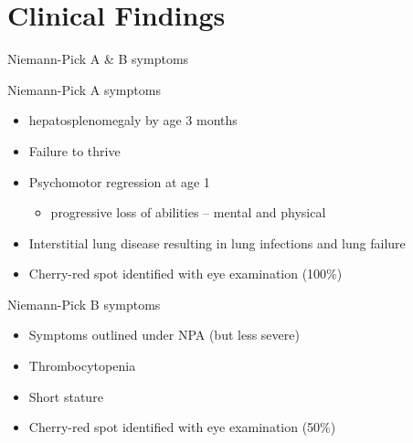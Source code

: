 \documentclass[presentation, smaller]{beamer}
\begin{document}
\section{Clinical Findings}
\label{sec:orgheadline14}

\begin{frame}[label={sec:orgheadline11}]{Niemann-Pick A \& B symptoms}
\begin{block}{Niemann-Pick A symptoms}
\begin{itemize}
\item hepatosplenomegaly by age 3 months
\item Failure to thrive
\item Psychomotor regression at age 1
\begin{itemize}
\item progressive loss of abilities – mental and physical
\end{itemize}
\item Interstitial lung disease resulting in lung infections and lung failure
\item Cherry-red spot identified with eye examination (100\%)
\end{itemize}
\end{block}

\begin{block}{Niemann-Pick B symptoms}
\begin{itemize}
\item Symptoms outlined under NPA (but less severe)
\item Thrombocytopenia
\item Short stature
\item Cherry-red spot identified with eye examination (50\%)
\end{itemize}
\end{block}
\end{frame}
\end{document}
